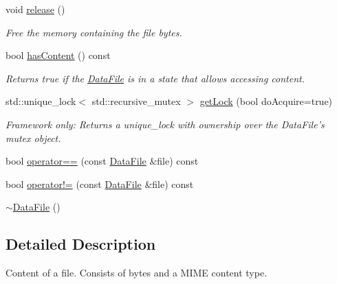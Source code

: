 \begin{DoxyCompactItemize}
void \hyperlink{classBUSBOY_1_1DataFile_ac8bda59f629f6b8437f51bcd4e15cae0}{release} ()
\begin{DoxyCompactList}\small\item\em Free the memory containing the file bytes. \item\end{DoxyCompactList}\item 
bool \hyperlink{classBUSBOY_1_1DataFile_aa127c5ce6db57b3e35151a2c44404f0a}{hasContent} () const 
\begin{DoxyCompactList}\small\item\em Returns true if the \hyperlink{classBUSBOY_1_1DataFile}{DataFile} is in a state that allows accessing content. \item\end{DoxyCompactList}\item 
std::unique\_\-lock$<$ std::recursive\_\-mutex $>$ \hyperlink{classBUSBOY_1_1DataFile_adf051be65ca0f4d18a07dea5c9ddbbe0}{getLock} (bool doAcquire=true)
\begin{DoxyCompactList}\small\item\em Framework only: Returns a unique\_\-lock with ownership over the DataFile's mutex object. \item\end{DoxyCompactList}\item 
bool \hyperlink{classBUSBOY_1_1DataFile_aca053deb6ed3aeff58ebca88a8bd2267}{operator==} (const \hyperlink{classBUSBOY_1_1DataFile}{DataFile} \&file) const 
\item 
bool \hyperlink{classBUSBOY_1_1DataFile_a80fb802d3eeea675fb10c6980a1d957e}{operator!=} (const \hyperlink{classBUSBOY_1_1DataFile}{DataFile} \&file) const 
\item 
\hyperlink{classBUSBOY_1_1DataFile_a6354d7e99724c107edb8167a0b16bbd3}{$\sim$DataFile} ()
\end{DoxyCompactItemize}


\subsection{Detailed Description}
Content of a file. Consists of bytes and a MIME content type. 

